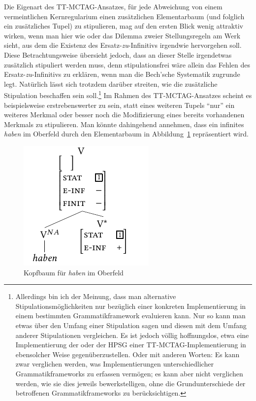 Die Eigenart des TT-MCTAG-Ansatzes, für jede Abweichung von einem vermeintlichen Kernregularium einen zusätzlichen Elementarbaum (und folglich ein zusätzliches Tupel) zu stipulieren, mag auf den ersten Blick wenig attraktiv wirken, wenn man hier wie \cite{Bech:63} oder \cite{Vogel:09} das Dilemma zweier Stellungsregeln am Werk sieht, aus dem die Existenz des Ersatz-\emph{zu}-Infinitivs irgendwie hervorgehen soll. Diese Betrachtungsweise übersieht jedoch, dass an dieser Stelle irgendetwas zusätzlich stipuliert werden muss, denn stipulationsfrei wäre allein das Fehlen des Ersatz-\emph{zu}-Infinitivs zu erklären, wenn man die Bech'sche Systematik zugrunde legt. Natürlich lässt sich trotzdem darüber streiten, wie die zusätzliche Stipulation beschaffen sein soll.\footnote{Allerdings bin ich der Meinung, dass man alternative Stipulationsmöglichkeiten nur bezüglich einer konkreten Implementierung in einem bestimmten Grammatikframework evaluieren kann. Nur so kann man etwas über den Umfang einer Stipulation sagen und diesen mit dem Umfang anderer Stipulationen vergleichen. Es ist jedoch völlig hoffnungslos, etwa eine Implementierung der  oder der HPSG einer TT-MCTAG-Implementierung in ebensolcher Weise gegenüberzustellen. Oder mit anderen Worten: Es kann zwar verglichen werden, was Implementierungen unterschiedlicher Grammatikframeworks zu erfassen vermögen; es kann aber nicht verglichen werden, wie sie dies jeweils bewerkstelligen, ohne die Grundunterschiede der betroffenen Grammatikframeworks zu berücksichtigen.} Im Rahmen des TT-MCTAG-Ansatzes scheint es beispielsweise erstrebenswerter zu sein, statt eines weiteren Tupels "`nur"' ein weiteres Merkmal oder besser noch die Modifizierung eines bereits vorhandenen Merkmals zu stipulieren. Man könnte dahingehend annehmen, dass ein infinites {\it haben} im Oberfeld durch den Elementarbaum in Abbildung~\ref{fig-ttmctag-ersatzzu-2} repräsentiert wird.
\begin{figure}[t]
\centering
\includegraphics{graphics/abb721.pdf}
\caption{\label{fig-ttmctag-ersatzzu-2}Kopfbaum für {\it haben} im Oberfeld}
\end{figure}
